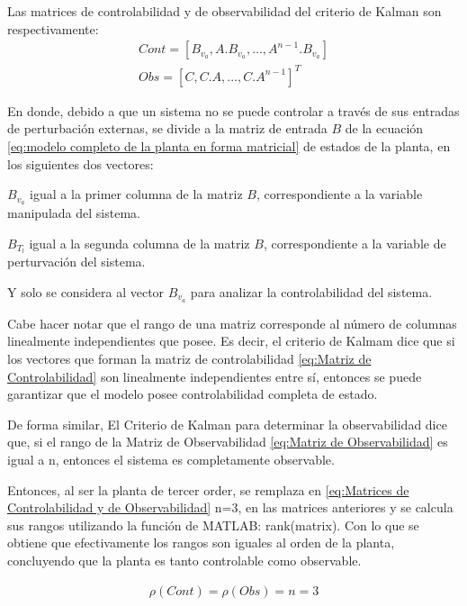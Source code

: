 \documentclass{article}
\begin{document}
\begin{sloppypar}
Las matrices de controlabilidad y de observabilidad del criterio de Kalman son respectivamente:
\begin{subequations} \label{eq:Matrices de Controlabilidad y de Observabilidad}
	\begin{align}
        \label{eq:Matriz de Controlabilidad} Cont=\left[B_{v_a},A.B_{v_a},\ldots,A^{n-1}.B_{v_a}\right]
        \\
        \label{eq:Matriz de Observabilidad} Obs=\left[C,C.A,\ldots,C.A^{n-1}\right]^T
	\end{align}
\end{subequations}

En donde, debido a que un sistema no se puede controlar a través de sus entradas de perturbación externas, se divide a la matriz de entrada $B$ de la ecuación \ref{eq:modelo completo de la planta en forma matricial} de estados de la planta, en los siguientes dos vectores:
\begin{description}
    \item $B_{v_a}$ igual a la primer columna de la matriz $B$, correspondiente a la variable manipulada del sistema.
    \item $B_{T_l}$ igual a la segunda columna de la matriz $B$, correspondiente a la variable de perturvación del sistema.
\end{description}
Y solo se considera al vector $B_{v_a}$ para analizar la controlabilidad del sistema.

Cabe hacer notar que el rango de una matriz corresponde al número de columnas linealmente independientes que posee. Es decir, el criterio de Kalmam dice que si los vectores que forman la matriz de controlabilidad \ref{eq:Matriz de Controlabilidad} son linealmente independientes entre sí, entonces se puede garantizar que el modelo posee controlabilidad completa de estado.

De forma similar, El Criterio de Kalman para determinar la observabilidad dice que, si el rango de la Matriz de Observabilidad \ref{eq:Matriz de Observabilidad} es igual a n, entonces el sistema es completamente observable.

Entonces, al ser la planta de tercer order, se remplaza en \ref{eq:Matrices de Controlabilidad y de Observabilidad} n=3, en las matrices anteriores y se calcula sus rangos utilizando la función de MATLAB: rank(matrix). Con lo que se obtiene que efectivamente los rangos son iguales al orden de la planta, concluyendo que la planta es tanto controlable como observable.

\begin{align} \label{eq:Rangos de las Matrices de Controlabilidad y de Observabilidad}
    \rho(Cont)=\rho(Obs)=n=3
\end{align}


\end{sloppypar}
\end{document}
